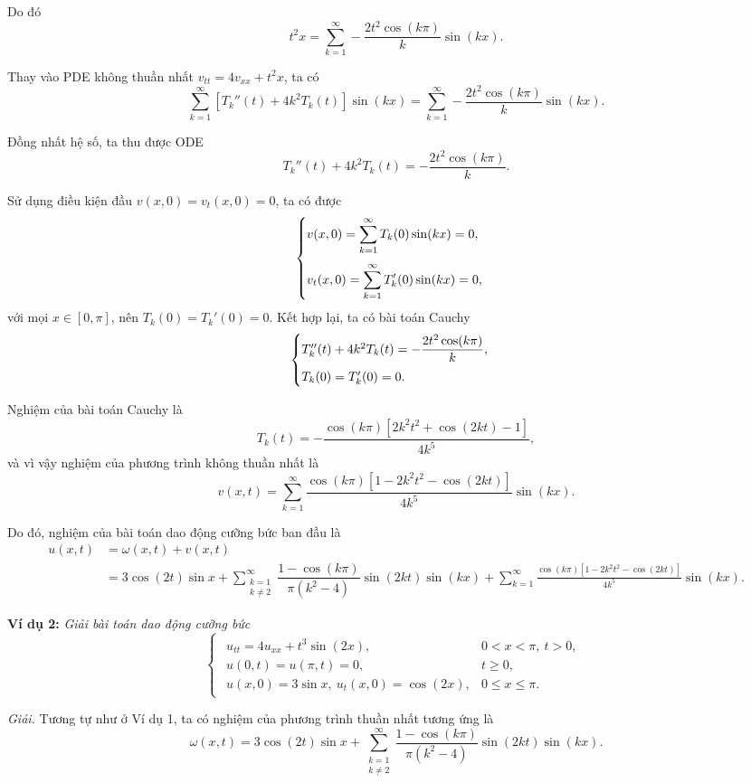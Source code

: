 \documentclass[10pt, a4paper]{article}
\begin{document}
	Do đó $$t^2x=\sum_{k=1}^\infty-\frac{2t^2\cos(k\pi)}{k}\sin(kx).$$
	
	Thay vào PDE không thuần nhất $v_{tt}=4v_{xx}+t^2x$, ta có $$\sum_{k=1}^\infty[T_k''(t)+4k^2T_k(t)]\sin(kx)=\sum_{k=1}^\infty-\frac{2t^2\cos(k\pi)}{k}\sin(kx).$$
	
	Đồng nhất hệ số, ta thu được ODE $$T_k''(t)+4k^2T_k(t)=-\frac{2t^2\cos(k\pi)}{k}.$$
	
	Sử dụng điều kiện đầu $v(x,0)=v_t(x,0)=0$, ta có được $$\begin{cases}
		v(x,0)=\displaystyle\sum_{k=1}^\infty T_k(0)\sin(kx)=0,\\
		\noalign{\vskip7pt}
		v_t(x,0)=\displaystyle\sum_{k=1}^\infty T_k'(0)\sin(kx)=0,
	\end{cases}$$
	với mọi $x\in[0,\pi]$, nên $T_k(0)=T_k'(0)=0$. Kết hợp lại, ta có bài toán Cauchy $$\begin{cases}
		T_k''(t)+4k^2T_k(t)=-\dfrac{2t^2\cos(k\pi)}{k},\\
		\noalign{\vskip5pt}
		T_k(0)=T_k'(0)=0.
	\end{cases}$$
	
	Nghiệm của bài toán Cauchy là $$T_k(t)=-\frac{\cos(k\pi)[2k^2t^2+\cos(2kt)-1]}{4k^5},$$
	và vì vậy nghiệm của phương trình không thuần nhất là $$v(x,t)=\sum_{k=1}^\infty\frac{\cos(k\pi)[1-2k^2t^2-\cos(2kt)]}{4k^5}\sin(kx).$$
	
	Do đó, nghiệm của bài toán dao động cưỡng bức ban đầu là \begin{align*}
		u(x,t)&=\omega(x,t)+v(x,t)\\
		&=3\cos(2t)\sin x+\sum_{\substack{k=1\\k\ne2}}^\infty\dfrac{1-\cos(k\pi)}{\pi(k^2-4)}\sin(2kt)\sin(kx)+\sum_{k=1}^\infty\frac{\cos(k\pi)[1-2k^2t^2-\cos(2kt)]}{4k^5}\sin(kx).
	\end{align*}
	
	\textbf{Ví dụ 2:} \textit{Giải bài toán dao động cưỡng bức} $$\begin{cases}
		\begin{array}{ll}
			u_{tt}=4u_{xx}+t^3\sin(2x), & 0<x<\pi,~t>0, \\
			u(0,t)=u(\pi,t)=0, & t\ge0,\\
			u(x,0)=3\sin x,~u_t(x,0)=\cos(2x), & 0\le x\le\pi.
		\end{array}
	\end{cases}$$
	
	\textit{Giải.} Tương tự như ở Ví dụ 1, ta có nghiệm của phương trình thuần nhất tương ứng là $$\omega(x,t)=3\cos(2t)\sin x+\sum_{\substack{k=1\\k\ne2}}^\infty\dfrac{1-\cos(k\pi)}{\pi(k^2-4)}\sin(2kt)\sin(kx).$$
	
\end{document}
